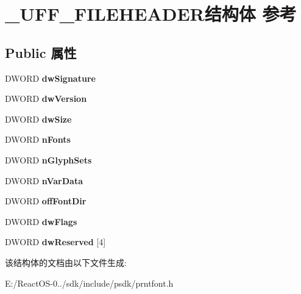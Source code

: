 \hypertarget{struct___u_f_f___f_i_l_e_h_e_a_d_e_r}{}\section{\+\_\+\+U\+F\+F\+\_\+\+F\+I\+L\+E\+H\+E\+A\+D\+E\+R结构体 参考}
\label{struct___u_f_f___f_i_l_e_h_e_a_d_e_r}
\subsection*{Public 属性}
\begin{DoxyCompactItemize}
\item 
\mbox{\label{struct___u_f_f___f_i_l_e_h_e_a_d_e_r_a734f4289f8271e44f59a0f1727feb592}} 
D\+W\+O\+RD {\bfseries dw\+Signature}
\item 
\mbox{\label{struct___u_f_f___f_i_l_e_h_e_a_d_e_r_a162c482bd3ff8dc6f1432b6a99400dd5}} 
D\+W\+O\+RD {\bfseries dw\+Version}
\item 
\mbox{\label{struct___u_f_f___f_i_l_e_h_e_a_d_e_r_a4bf3f3465ee7a33f8b6e6b63eea52ca6}} 
D\+W\+O\+RD {\bfseries dw\+Size}
\item 
\mbox{\label{struct___u_f_f___f_i_l_e_h_e_a_d_e_r_a3df9cd838fe2b567e8bd77f760b06910}} 
D\+W\+O\+RD {\bfseries n\+Fonts}
\item 
\mbox{\label{struct___u_f_f___f_i_l_e_h_e_a_d_e_r_aa771fa8b7eb3ae90727ac9e0317b97a2}} 
D\+W\+O\+RD {\bfseries n\+Glyph\+Sets}
\item 
\mbox{\label{struct___u_f_f___f_i_l_e_h_e_a_d_e_r_ac46ab37027ee34ca41cfe0846084a90c}} 
D\+W\+O\+RD {\bfseries n\+Var\+Data}
\item 
\mbox{\label{struct___u_f_f___f_i_l_e_h_e_a_d_e_r_a40b9d2c1c622847ea18891809f2b1a24}} 
D\+W\+O\+RD {\bfseries off\+Font\+Dir}
\item 
\mbox{\label{struct___u_f_f___f_i_l_e_h_e_a_d_e_r_a4080527779efc3b28b68d222a4545b56}} 
D\+W\+O\+RD {\bfseries dw\+Flags}
\item 
\mbox{\label{struct___u_f_f___f_i_l_e_h_e_a_d_e_r_ae9f54627988ca61cd71f7c0e2f6e7f6e}} 
D\+W\+O\+RD {\bfseries dw\+Reserved} \mbox{[}4\mbox{]}
\end{DoxyCompactItemize}


该结构体的文档由以下文件生成\+:\begin{DoxyCompactItemize}
\item 
E\+:/\+React\+O\+S-\/0../sdk/include/psdk/prntfont.\+h\end{DoxyCompactItemize}
